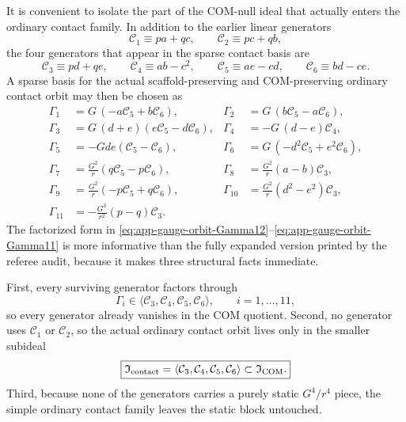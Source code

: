 \documentclass[11pt]{article}
\begin{document}
It is convenient to isolate the part of the COM-null ideal that actually enters
the ordinary contact family.  In addition to the earlier linear generators
\begin{equation}
\mathcal C_1\equiv pa+qc,
\qquad
\mathcal C_2\equiv pc+qb,
\label{eq:app-gauge-orbit-C12}
\end{equation}
the four generators that appear in the sparse contact basis are
\begin{equation}
\boxed{
\mathcal C_3\equiv pd+qe,
\qquad
\mathcal C_4\equiv ab-c^2,
\qquad
\mathcal C_5\equiv ae-cd,
\qquad
\mathcal C_6\equiv bd-ce.}
\label{eq:app-gauge-orbit-C3456}
\end{equation}
A sparse basis for the actual scaffold-preserving and COM-preserving ordinary
contact orbit may then be chosen as
\begin{align}
\Gamma_1&=G\,(-a\mathcal C_5+b\mathcal C_6),
&
\Gamma_2&=G\,(b\mathcal C_5-a\mathcal C_6),
\label{eq:app-gauge-orbit-Gamma12}
\\
\Gamma_3&=G\,(d+e)(e\mathcal C_5-d\mathcal C_6),
&
\Gamma_4&=-G\,(d-e)\mathcal C_4,
\label{eq:app-gauge-orbit-Gamma34}
\\
\Gamma_5&=-Gde(\mathcal C_5-\mathcal C_6),
&
\Gamma_6&=G\,(-d^2\mathcal C_5+e^2\mathcal C_6),
\label{eq:app-gauge-orbit-Gamma56}
\\
\Gamma_7&=\frac{G^2}{r}(q\mathcal C_5-p\mathcal C_6),
&
\Gamma_8&=\frac{G^2}{r}(a-b)\mathcal C_3,
\label{eq:app-gauge-orbit-Gamma78}
\\
\Gamma_9&=\frac{G^2}{r}(-p\mathcal C_5+q\mathcal C_6),
&
\Gamma_{10}&=\frac{G^2}{r}(d^2-e^2)\mathcal C_3,
\label{eq:app-gauge-orbit-Gamma910}
\\
\Gamma_{11}&=-\frac{G^3}{r^2}(p-q)\mathcal C_3.
\label{eq:app-gauge-orbit-Gamma11}
\end{align}
The factorized form in
\eqref{eq:app-gauge-orbit-Gamma12}--\eqref{eq:app-gauge-orbit-Gamma11} is more
informative than the fully expanded version printed by the referee audit,
because it makes three structural facts immediate.

First, every surviving generator factors through
\begin{equation}
\Gamma_i\in\langle \mathcal C_3,\mathcal C_4,\mathcal C_5,\mathcal C_6\rangle,
\qquad i=1,\dots,11,
\label{eq:app-gauge-orbit-factorization}
\end{equation}
so every generator already vanishes in the COM quotient.
Second, no generator uses $\mathcal C_1$ or $\mathcal C_2$, so the actual
ordinary contact orbit lives only in the smaller subideal
\begin{equation}
\boxed{
\mathfrak I_{\rm contact}
=
\langle \mathcal C_3,\mathcal C_4,\mathcal C_5,\mathcal C_6\rangle
\subset
\mathfrak I_{\rm COM}.}
\label{eq:app-gauge-orbit-contact-ideal}
\end{equation}
Third, because none of the generators carries a purely static $G^4/r^4$ piece,
the simple ordinary contact family leaves the static block untouched.
\end{document}
